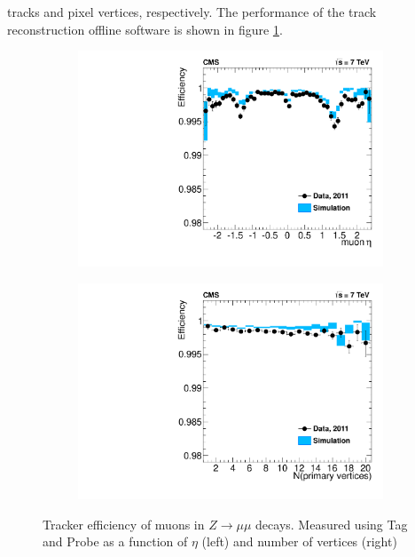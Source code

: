 tracks and pixel vertices, respectively. The performance of the track reconstruction
offline software is shown in figure \ref{fig:TrackerPerformance}.
\begin{figure}[t]
  \centering
 \begin{subfigure}[b]{.4\textwidth}
	\includegraphics[width=\textwidth]{images/TrackerEffEta.pdf}
  \end{subfigure}
  \begin{subfigure}[b]{.4\textwidth}
	\includegraphics[width=\textwidth]{images/TrackerEffVtx.pdf}
  \end{subfigure}
  	\caption[Tracker Performance]
   	{Tracker efficiency of muons in $Z\rightarrow\mu\mu$ decays. Measured using Tag and Probe as a function of $\eta$ (left) and number of vertices (right)}
	\label{fig:TrackerPerformance}
\end{figure}
